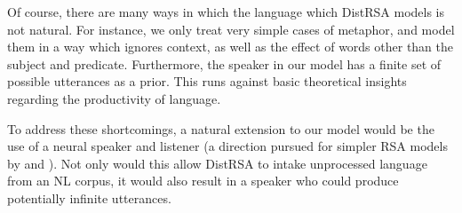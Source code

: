 \documentclass[10pt,letterpaper,twocolumn]{article}
\begin{document}
Of course, there are many ways in which the language which DistRSA models is not natural. For instance, we only treat very simple cases of metaphor, and model them in a way which ignores context, as well as the effect of words other than the subject and predicate. Furthermore, the speaker in our model has a finite set of possible utterances as a prior. This runs against basic theoretical insights regarding the productivity of language.

To address these shortcomings, a natural extension to our model would be the use of a neural speaker and listener (a direction pursued for simpler RSA models by \cite{andreas} and \cite{monroe2015learning}). Not only would this allow DistRSA to intake unprocessed language from an NL corpus, it would also result in a speaker who could produce potentially infinite utterances.

\printbibliography
\end{document}
